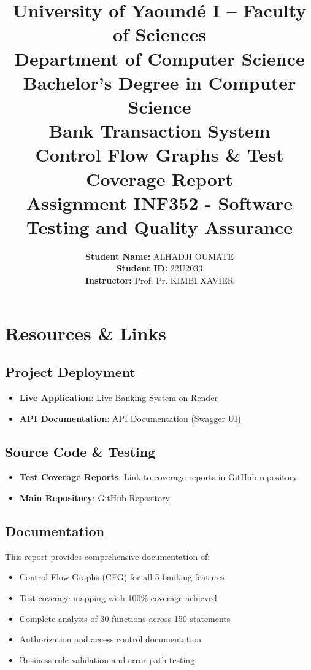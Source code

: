 \documentclass[12pt,a4paper]{report}
\title{
\Large \textbf{University of Yaoundé I -- Faculty of Sciences}\\[0.2cm]
\large \textbf{Department of Computer Science}\\
\large \textbf{Bachelor's Degree in Computer Science}\\[0.8cm]
\LARGE \textbf{Bank Transaction System}\\[0.5cm]
\Large Control Flow Graphs \& Test Coverage Report\\[0.35cm]
\Large \textbf{Assignment INF352 - Software Testing and Quality Assurance}
}
\author{\large \textbf{Student Name:} ALHADJI OUMATE\\
\large \textbf{Student ID:} 22U2033\\
\large \textbf{Instructor:} Prof. Pr. KIMBI XAVIER}
\date{}
\begin{document}
\maketitle

\newpage
\chapter*{Resources \& Links}

\section*{Project Deployment}
\begin{itemize}
    \item \textbf{Live Application}: \href{https://bank-transaction-system-9lgc.onrender.com}{Live Banking System on Render}
    \item \textbf{API Documentation}: \href{https://bank-transaction-system-9lgc.onrender.com/api/docs}{API Documentation (Swagger UI)}
\end{itemize}

\section*{Source Code \& Testing}
\begin{itemize}
    \item \textbf{Test Coverage Reports}: \href{https://github.com/ALH-hub/bank-transaction-system/tree/coverage/coverage}{Link to coverage reports in GitHub repository}
    \item \textbf{Main Repository}: \href{https://github.com/ALH-hub/bank-transaction-system}{GitHub Repository}
\end{itemize}

\section*{Documentation}
This report provides comprehensive documentation of:
\begin{itemize}
    \item Control Flow Graphs (CFG) for all 5 banking features
    \item Test coverage mapping with 100\% coverage achieved
    \item Complete analysis of 30 functions across 150 statements
    \item Authorization and access control documentation
    \item Business rule validation and error path testing
\end{itemize}
\end{document}
